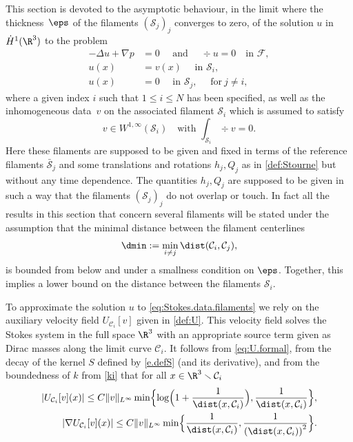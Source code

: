 This section is devoted to the asymptotic behaviour, in the limit where the thickness~$\eps$ of the filaments
$(\mathcal S_j)_j$ converges to zero, of the solution $u $ in $\dot H^1(\R^3)$ to the problem
\begin{equation} \label{eq:Stokes.data.filaments}
\begin{aligned}
- \Delta u + \nabla p &= 0 \quad \text{ and }\quad \div u = 0 \quad \text{in } \mathcal F, \\
u(x) &= v(x) \quad \text{ in } \mathcal S_i, \\
u(x) &= 0 \quad \text{ in } \mathcal S_j, \quad \text{ for} ~ j \neq i,
\end{aligned}
\end{equation}
where a given index $i$ such that $1 \leq i \leq N$ has been specified, as well as the inhomogeneous data~$v$ on the associated filament $ \mathcal S_i$ which is assumed to satisfy
\begin{equation}
\label{ass-v}
v \in W^{1,\infty}(\mathcal S_i) \quad \text{with } \int_{\mathcal S_i} \div v = 0.
\end{equation}
Here these filaments are supposed to be given and fixed in terms of the reference filaments $\bar {\mathcal S}_j$ and some translations and rotations $h_j, Q_j$ as in \eqref{def:Stourne} but without any time dependence. The quantities $h_j, Q_j$ are supposed to be given in such a way that the filaments $(\mathcal S_j)_j$ do not overlap or touch. In fact all the results in this section that concern several filaments will be stated under the assumption that the minimal distance between the filament centerlines
\begin{equation} \label{dmin}
\dmin := \min_{i \neq j} \dist(\mathcal C_i,\mathcal C_j),
\end{equation}
is bounded from below and under a smallness condition on $\eps$. Together, this implies a lower bound on the distance between the filaments $\mathcal S_i$.

To approximate the solution $u$ to \eqref{eq:Stokes.data.filaments}
we rely on the auxiliary velocity field $U_{\mathcal C_i}[v]$ given in \eqref{def:U}.
This velocity field solves the Stokes system in the full space $\R^3$ with an appropriate source term given as {Dirac masses} along the limit curve $\mathcal C_i$.
It follows from \eqref{eq:U.formal}, from the decay of {the kernel} $S$ defined by \eqref{e.defS} (and its derivative), and from the boundedness of $k$ from \eqref{ki} that for all $x \in \R^3 \smallsetminus \mathcal C_i$
\begin{align}
|U_{\mathcal C_i}[v](x)| \leq C \|v\|_{L^\infty} \min \Bigl\{ \log \Bigl(1 + \frac 1 {\dist(x, \mathcal C_i)} \Bigr), \frac 1 {\dist(x, \mathcal C_i)} \Bigr \}, \label{eq:decay.U} \\
|\nabla U_{\mathcal C_i}[v](x)| \leq C \|v\|_{L^\infty} \min \Bigl\{ \frac 1 {\dist(x, \mathcal C_i)}, \frac 1 {\left(\dist(x, \mathcal C_i)\right)^2} \Bigr \}. \label{eq:decay.nabla.U}
\end{align}

